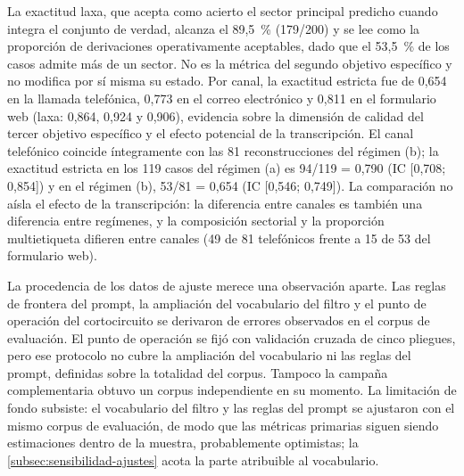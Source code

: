 La exactitud laxa, que acepta como acierto el sector principal predicho cuando integra el conjunto de verdad, alcanza el 89,5~\% (179/200) y se lee como la proporción de derivaciones operativamente aceptables, dado que el 53,5~\% de los casos admite más de un sector. No es la métrica del segundo objetivo específico y no modifica por sí misma su estado. Por canal, la exactitud estricta fue de 0,654 en la llamada telefónica, 0,773 en el correo electrónico y 0,811 en el formulario web (laxa: 0,864, 0,924 y 0,906), evidencia sobre la dimensión de calidad del tercer objetivo específico y el efecto potencial de la transcripción. El canal telefónico coincide íntegramente con las 81 reconstrucciones del régimen (b); la exactitud estricta en los 119 casos del régimen (a) es 94/119 = 0,790 (IC [0,708; 0,854]) y en el régimen (b), 53/81 = 0,654 (IC [0,546; 0,749]). La comparación no aísla el efecto de la transcripción: la diferencia entre canales es también una diferencia entre regímenes, y la composición sectorial y la proporción multietiqueta difieren entre canales (49 de 81 telefónicos frente a 15 de 53 del formulario web).

La procedencia de los datos de ajuste merece una observación aparte. Las reglas de frontera del prompt, la ampliación del vocabulario del filtro y el punto de operación del cortocircuito se derivaron de errores observados en el corpus de evaluación. El punto de operación se fijó con validación cruzada de cinco pliegues, pero ese protocolo no cubre la ampliación del vocabulario ni las reglas del prompt, definidas sobre la totalidad del corpus. Tampoco la campaña complementaria obtuvo un corpus independiente en su momento. La limitación de fondo subsiste: el vocabulario del filtro y las reglas del prompt se ajustaron con el mismo corpus de evaluación, de modo que las métricas primarias siguen siendo estimaciones dentro de la muestra, probablemente optimistas; la \autoref{subsec:sensibilidad-ajustes} acota la parte atribuible al vocabulario.

